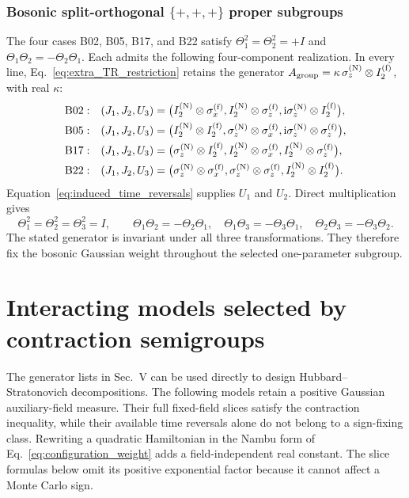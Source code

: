 \documentclass[onecolumn,aps,prb,amsmath,amssymb,superscriptaddress,longbibliography,floatfix]{revtex4-2}
\newcommand{\ii}{\mathrm{i}}
\begin{document}
\subsubsection*{\texorpdfstring{Bosonic split-orthogonal
\(\{+,+,+\}\) proper subgroups}{Bosonic split-orthogonal \{+,+,+\}
proper subgroups}}
The four cases B02, B05, B17, and B22 satisfy \(\Theta_1^2=\Theta_2^2=+I\) and \(\Theta_1\Theta_2=-\Theta_2\Theta_1\).  Each admits the following four-component realization.  In every line, Eq.~\eqref{eq:extra_TR_restriction} retains the generator \(A_{\rm group}=\kappa\,\sigma_z^{({\rm N})}\otimes I_2^{({\rm f})}\), with real \(\kappa\):
\begin{align*}
\mathrm{B02}:\quad &(J_1,J_2,U_3)
=\bigl(I_2^{({\rm N})}\otimes\sigma_x^{({\rm f})},
I_2^{({\rm N})}\otimes\sigma_z^{({\rm f})},
\ii\sigma_z^{({\rm N})}\otimes I_2^{({\rm f})}\bigr),\notag\\*
\mathrm{B05}:\quad &(J_1,J_2,U_3)
=\bigl(I_2^{({\rm N})}\otimes I_2^{({\rm f})},
\sigma_z^{({\rm N})}\otimes\sigma_x^{({\rm f})},
\ii\sigma_z^{({\rm N})}\otimes\sigma_z^{({\rm f})}\bigr),\notag\\*
\mathrm{B17}:\quad &(J_1,J_2,U_3)
=\bigl(\sigma_z^{({\rm N})}\otimes I_2^{({\rm f})},
I_2^{({\rm N})}\otimes\sigma_x^{({\rm f})},
I_2^{({\rm N})}\otimes\sigma_z^{({\rm f})}\bigr),\notag\\*
\mathrm{B22}:\quad &(J_1,J_2,U_3)
=\bigl(\sigma_z^{({\rm N})}\otimes\sigma_x^{({\rm f})},
\sigma_z^{({\rm N})}\otimes\sigma_z^{({\rm f})},
 I_2^{({\rm N})}\otimes I_2^{({\rm f})}\bigr).
\end{align*}
Equation~\eqref{eq:induced_time_reversals} supplies \(U_1\) and \(U_2\).  Direct multiplication gives
\[
\Theta_1^2=\Theta_2^2=\Theta_3^2=I,\qquad
\Theta_1\Theta_2=-\Theta_2\Theta_1,\quad
\Theta_1\Theta_3=-\Theta_3\Theta_1,\quad
\Theta_2\Theta_3=-\Theta_3\Theta_2.
\]
The stated generator is invariant under all three transformations.  They therefore fix the bosonic Gaussian weight throughout the selected one-parameter subgroup.





\section{Interacting models selected by contraction semigroups}

The generator lists in Sec.~V can be used directly to design Hubbard--Stratonovich decompositions.  The following models retain a positive Gaussian auxiliary-field measure.  Their full fixed-field slices satisfy the contraction inequality, while their available time reversals alone do not belong to a sign-fixing class.  Rewriting a quadratic Hamiltonian in the Nambu form of Eq.~\eqref{eq:configuration_weight} adds a field-independent real constant.  The slice formulas below omit its positive exponential factor because it cannot affect a Monte Carlo sign.
\end{document}
